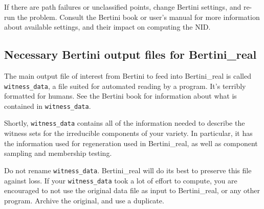 If there are path failures or unclassified points, change Bertini settings, and re-run the problem.  Consult the Bertini book or user's manual for more information about available settings, and their impact on computing the NID.


\clearpage
\subsection{Necessary Bertini output files for Bertini\_real}

The main output file of interest from Bertini to feed into Bertini\_real is called \texttt{witness\_data}, a file suited for automated reading by a program. It's terribly formatted for humans. See the Bertini book \cite{bates2013numerically} for information about what is contained in {\tt witness\_data}.  

Shortly, {\tt witness\_data} contains all of the information needed to describe the witness sets for the irreducible components of your variety. In particular, it has the information used for regeneration used in Bertini\_real, as well as component sampling and membership testing.

Do not rename {\tt witness\_data}.  Bertini\_real will do its best to preserve this file against loss.  If your {\tt witness\_data} took a lot of effort to compute, you are encouraged to not use the original data file as input to Bertini\_real, or any other program.  Archive the original, and use a duplicate. 

